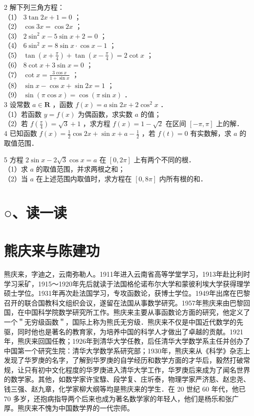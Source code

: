 \documentclass[10pt]{article}
\begin{document}
2 解下列三角方程：\\
（1） \(3 \tan 2 x+1=0\) ；\\
（2） \(\cos 3 x=\cos 2 x\) ；\\
（3） \(2 \sin ^{2} x-5 \sin x+2=0\) ；\\
（4） \(6 \sin ^{2} x=8 \sin x \cdot \cos x-1\) ；\\
（5） \(\tan \left(x+\frac{\pi}{4}\right)+\tan \left(x-\frac{\pi}{4}\right)=2 \cot x\) ；\\
（6） \(8 \cot x+3 \sin x=0\) ；\\
（7） \(\cot x=\frac{3 \cos x}{1+\sin x}\) ；\\
（8） \(\sin x-\cos x+\sin 2 x=1\) ；\\
（9） \(\sin (\pi \cos x)=\cos (\pi \sin x)\) ．\\
3 设常数 \(a \in \mathbf{R}\) ，函数 \(f(x)=a \sin 2 x+2 \cos ^{2} x\) ．\\
（1）若函数 \(y=f(x)\) 为偶函数，求实数 \(a\) 的值；\\
（2）若 \(f\left(\frac{\pi}{4}\right)=\sqrt{3}+1\) ，求方程 \(f(x)=1-\sqrt{2}\) 在区间 \([-\pi, \pi]\) 上的解．\\
4 已知函数 \(f(x)=\frac{1}{2} \cos 2 x+\sin x+a-\frac{1}{2}\) ，若 \(f(t)=0\) 有实数解，求 \(a\) 的取值范围．

5 方程 \(2 \sin x-2 \sqrt{3} \cos x=a\) 在 \([0,2 \pi]\) 上有两个不同的根．\\
（1）求 \(a\) 的取值范围，并求两根之和；\\
（2）当 \(a\) 在上述范围内取值时，求方程在 \([0,8 \pi]\) 内所有根的和．

\section*{○、读一读}
\section*{熊庆来与陈建功}
熊庆来，字迪之，云南弥勒人。1911年进入云南省高等学堂学习，1913年赴比利时学习采矿，1915～1920年先后就读于法国格伦诺布尔大学和蒙彼利埃大学获得理学硕士学位。1931年再次赴法国学习，专攻函数论，获博士学位。1949年出席在巴黎召开的联合国教科文组织会议，遂留在法国从事数学研究。1957年熊庆来由巴黎回国，在中国科学院数学研究所工作。熊庆来主要从事函数论方面的研究，他定义了一个＂无穷级函数＂，国际上称为熊氏无穷级．熊庆来不仅是中国近代数学的先驱，同时他也是著名的教育家，为培养中国的科学人才做出了卓越的贡献。1921年，熊庆来回国任教；1926年到清华大学任教，后任清华大学数学系主任并创办了中国第一个研究生院：清华大学数学系研究部；1930年，熊庆来从《科学》杂志上发现了华罗庚的名字，了解到华罗庚的自学经历和数学方面的才华后，毅然打破常规，让只有初中文化程度的华罗庚进入清华大学工作，华罗庚后来成为了闻名世界的数学家。其他，如数学家许宝騄、段学复、庄圻泰，物理学家严济慈、赵忠尧、钱三强、赵九章，化学家柳大纲等均是熊庆来的学生．在 20 世纪 60 年代，他已 70 多岁，还抱病指导两个后来也成为著名数学家的年轻人，他们是杨乐和张广厚。熊庆来不愧为中国数学界的一代宗师。
\end{document}
